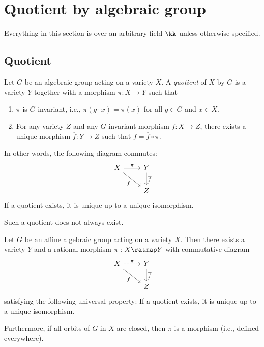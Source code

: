 \section{Quotient by algebraic group}

Everything in this section is over an arbitrary field \(\kk\) unless otherwise specified.

\subsection{Quotient}

    \begin{definition}\label{def:quotient_of_variety_by_group_action}
        Let \(G\) be an algebraic group acting on a variety \(X\).
        A \emph{quotient} of \(X\) by \(G\) is a variety \(Y\) together with a morphism \(\pi: X \to Y\) such that
        \begin{enumerate}
            \item \(\pi\) is \(G\)-invariant, i.e., \(\pi(g \cdot x) = \pi(x)\) for all \(g \in G\) and \(x \in X\).
            \item For any variety \(Z\) and any \(G\)-invariant morphism \(f: X \to Z\), there exists a unique morphism \(\overline{f}: Y \to Z\) such that \(f = \overline{f} \circ \pi\).
        \end{enumerate}
        In other words, the following diagram commutes:
        \[
            \begin{tikzcd}
                X \arrow[r, "\pi"] \arrow[rd, "f"'] & Y \arrow[d, "\overline{f}"] \\
                & Z
            \end{tikzcd}
        \]
        If a quotient exists, it is unique up to a unique isomorphism.
    \end{definition}

    Such a quotient does not always exist.

    \begin{theorem}\label{thm:existence_of_quotient_by_algebraic_group}
        Let \(G\) be an affine algebraic group acting on a variety \(X\).
        Then there exists a variety \(Y\) and a rational morphism \(\pi: X \ratmap Y\) with commutative diagram
        \[
            \begin{tikzcd}
                X \arrow[r, dashed, "\pi"] \arrow[rd, "f"'] & Y \arrow[d, "\overline{f}"] \\
                & Z
            \end{tikzcd}
        \]
        satisfying the following universal property:
        If a quotient exists, it is unique up to a unique isomorphism.

        Furthermore, if all orbits of \(G\) in \(X\) are closed, then \(\pi\) is a morphism (i.e., defined everywhere).
    \end{theorem}


